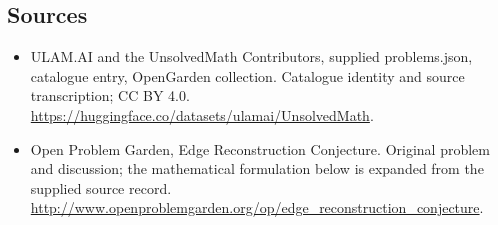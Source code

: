 \documentclass[11pt,a4paper]{article}
\begin{document}
\subsection{Sources}
\begin{itemize}
\item[S1] ULAM.AI and the UnsolvedMath Contributors, supplied problems.json, catalogue entry, OpenGarden collection. Catalogue identity and source transcription; CC BY 4.0.
\url{https://huggingface.co/datasets/ulamai/UnsolvedMath}.
\item[S2] Open Problem Garden, Edge Reconstruction Conjecture. Original problem and discussion; the mathematical formulation below is expanded from the supplied source record.
\url{http://www.openproblemgarden.org/op/edge_reconstruction_conjecture}.

\end{itemize}
\end{document}
